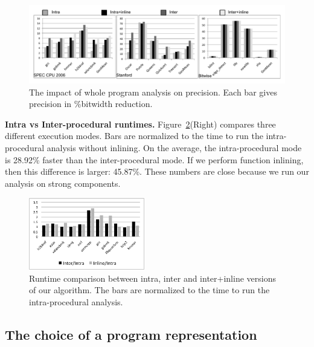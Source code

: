 \documentclass{paper}
\begin{document}
\begin{figure}[t!]
\begin{center}
\includegraphics[width=\textwidth]{images/wholeImpact}
\end{center}
\caption{\label{fig:wholeImpact}
The impact of whole program analysis on precision. Each bar gives precision in
\%bitwidth reduction.}
\end{figure}

\noindent
\textbf{Intra vs Inter-procedural runtimes.}
Figure~\ref{fig:timeComp}(Right) compares three different execution modes.
Bars are normalized to the time to run the intra-procedural analysis
without inlining.
On the average, the intra-procedural mode is 28.92\% faster than the
inter-procedural mode.
If we perform function inlining, then this difference is larger: 45.87\%.
These numbers are close because we run our analysis on strong components.

\begin{figure}[t!]
\begin{center}
\includegraphics[width=0.45\textwidth]{images/timeIntraInterInline}
\end{center}
\caption{\label{fig:timeComp}
Runtime comparison between intra, inter and inter+inline versions of
our algorithm.
The bars are normalized to the time to run the intra-procedural analysis.
}
\end{figure}


\subsection{The choice of a program representation}
\label{sub:program_rep}
\end{document}
